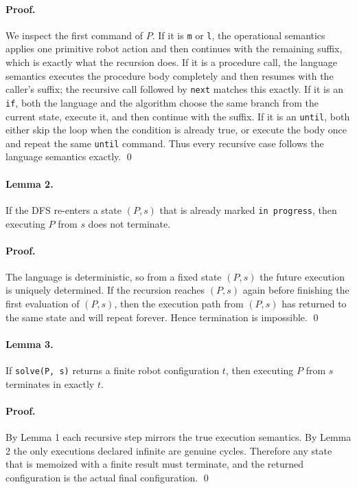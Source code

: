 \documentclass[11pt]{article}
\begin{document}
\paragraph{Proof.}
We inspect the first command of $P$.
If it is \texttt{m} or \texttt{l}, the operational semantics applies one primitive robot action and then
continues with the remaining suffix, which is exactly what the recursion does.
If it is a procedure call, the language semantics executes the procedure body completely and then resumes
with the caller's suffix; the recursive call followed by \texttt{next} matches this exactly.
If it is an \texttt{if}, both the language and the algorithm choose the same branch from the current state,
execute it, and then continue with the suffix.
If it is an \texttt{until}, both either skip the loop when the condition is already true, or execute the body
once and repeat the same \texttt{until} command.
Thus every recursive case follows the language semantics exactly. \qed

\paragraph{Lemma 2.}
If the DFS re-enters a state $(P,s)$ that is already marked \texttt{in progress}, then executing $P$ from $s$
does not terminate.

\paragraph{Proof.}
The language is deterministic, so from a fixed state $(P,s)$ the future execution is uniquely determined.
If the recursion reaches $(P,s)$ again before finishing the first evaluation of $(P,s)$, then the execution
path from $(P,s)$ has returned to the same state and will repeat forever.
Hence termination is impossible. \qed

\paragraph{Lemma 3.}
If \texttt{solve(P, s)} returns a finite robot configuration $t$, then executing $P$ from $s$ terminates in
exactly $t$.

\paragraph{Proof.}
By Lemma 1 each recursive step mirrors the true execution semantics.
By Lemma 2 the only executions declared infinite are genuine cycles.
Therefore any state that is memoized with a finite result must terminate, and the returned configuration is
the actual final configuration. \qed
\end{document}
